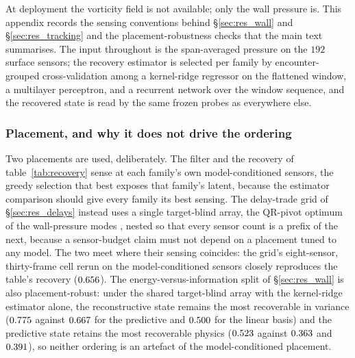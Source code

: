
At deployment the vorticity field is not available; only the wall pressure is.
This appendix records the sensing conventions behind \S\ref{sec:res_wall} and
\S\ref{sec:res_tracking} and the placement-robustness checks that the main text
summarises. The input throughout is the span-averaged pressure on the $192$
surface sensors; the recovery estimator is selected per family by encounter-grouped
cross-validation among a kernel-ridge regressor on the flattened window, a
multilayer perceptron, and a recurrent network over the window sequence, and the
recovered state is read by the same frozen probes as everywhere else.\re

\subsubsection*{Placement, and why it does not drive the ordering}
Two placements are used, deliberately. The filter and the recovery of
table~\ref{tab:recovery} sense at each family's own model-conditioned sensors, the
greedy selection that best exposes that family's latent, because the estimator
comparison should give every family its best sensing. The delay-trade grid of
\S\ref{sec:res_delays} instead uses a single target-blind array, the QR-pivot
optimum of the wall-pressure modes \citep{manohar2018sensors}, nested so that
every sensor count is a prefix of the next, because a sensor-budget claim must not
depend on a placement tuned to any model. The two meet where their sensing
coincides: the grid's eight-sensor, thirty-frame cell rerun on the
model-conditioned sensors closely reproduces the table's recovery
($0.656$). The energy-versus-information split of \S\ref{sec:res_wall}
is also placement-robust: under the shared target-blind array with the
kernel-ridge estimator alone, the reconstructive state remains the most
recoverable in variance ($0.775$ against $0.667$ for the
predictive and $0.500$ for the linear basis) and the predictive state
retains the most recoverable physics ($0.523$ against $0.363$ and
$0.391$), so neither ordering is an artefact of the model-conditioned
placement.\re

